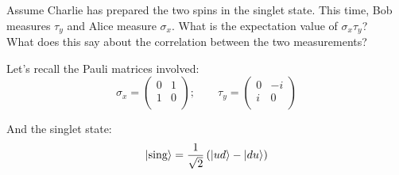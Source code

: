 \documentclass[solutions.tex]{subfiles}
\begin{document}
\maketitle
\begin{exercise} Assume Charlie has prepared  the two spins in the
singlet state. This time, Bob measures $\tau_y$ and Alice measure
$\sigma_x$. What is the expectation value of $\sigma_x\tau_y$? \\

What does this say about the correlation between the two measurements?
\end{exercise}
Let's recall the Pauli matrices involved:
\[
	\sigma_x = \begin{pmatrix}
		0 & 1 \\
		1 & 0 \\
	\end{pmatrix};\qquad \tau_y = \begin{pmatrix}
		0 & -i \\
		i & 0 \\
	\end{pmatrix}
\]

And the singlet state:
\[
	|\text{sing}\rangle = \frac{1}{\sqrt2}\left(|ud\rangle-|du\rangle\right)
\]
\end{document}
